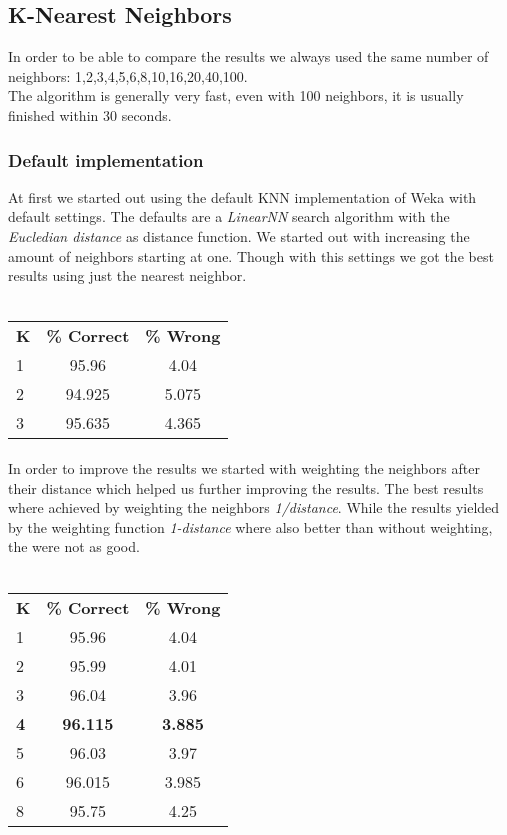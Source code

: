 \documentclass{article}
\begin{document}
\subsection{K-Nearest Neighbors}
In order to be able to compare the results we always used the same number of neighbors: 1,2,3,4,5,6,8,10,16,20,40,100.\\
The algorithm is generally very fast, even with 100 neighbors, it is usually finished within 30 seconds. 
\subsubsection{Default implementation}
At first we started out using the default KNN implementation of Weka with default settings. The defaults are a \emph{LinearNN} search algorithm with the \emph{Eucledian distance} as distance function. We started out with increasing the amount of neighbors starting at one. Though with this settings we got the best results using just the nearest neighbor. 
\\\\
\begin{center}
\begin{tabular}{ l | c |c }
\textbf{K} & \textbf{\% Correct} & \textbf{\% Wrong} \\
1 & 95.96 & 4.04 \\
2 & 94.925 & 5.075 \\
3 & 95.635 & 4.365 \\
\end{tabular}
\end{center}
\paragraph{}In order to improve the results we started with weighting the neighbors after their distance which helped us further improving the results. The best results where achieved by weighting the neighbors \emph{1/distance}. While the results yielded by the weighting function \emph{1-distance} where also better than without weighting, the were not as good.
\\\\
\begin{center}
\begin{tabular}{ l | c | c }
\textbf{K} & \textbf{\% Correct} & \textbf{\% Wrong} \\
1 & 95.96 & 4.04 \\
2 & 95.99& 4.01\\
3 & 96.04 & 3.96 \\
\textbf{4} & \textbf{96.115} & \textbf{3.885} \\
5 & 96.03 & 3.97 \\
6 & 96.015 & 3.985 \\
8 & 95.75 & 4.25 \\
\end{tabular}
\end{center}
\end{document}
